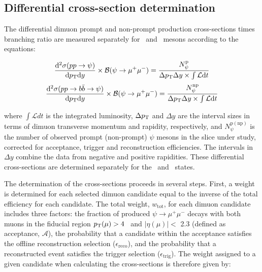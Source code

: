 \subsection{Differential cross-section determination}
\label{sec:s:diff_xSecDet}

The differential dimuon prompt and non-prompt production cross-sections times branching ratio 
are measured separately for \jpsi\ and \psiprime\ mesons according to the equations:

\begin{equation}
\frac{\mathrm{d}^2\sigma(pp \rightarrow \psi)}{\mathrm{d}\mbox{$p_{\text{T}}$}\mathrm{d}y} \times \mathcal{B} (\psi \rightarrow \mu^+\mu^- ) = \frac{N_{\psi}^{\mathrm{p}}}{\Delta \mbox{$p_{\text{T}}$} \Delta y \times \int\mathcal{L} \mathrm{d}t}
\label{equ:xSecP}
\end{equation}
\begin{equation}
\frac{\mathrm{d}^2\sigma(pp \rightarrow b\bar{b} \rightarrow \psi)}{\mathrm{d}\mbox{$p_{\text{T}}$}\mathrm{d}y} \times \mathcal{B} (\psi \rightarrow \mu^+\mu^- ) = \frac{N_{\psi}^{\mathrm{np}}}{\Delta \mbox{$p_{\text{T}}$} \Delta y \times \int\mathcal{L} \mathrm{d}t}
\label{equ:xSecNP}
\end{equation}

\noindent where $\int\mathcal{L} dt$ is the integrated luminosity, $\Delta \mbox{$p_{\text{T}}$} $ and $ \Delta y$ are the interval sizes in terms of dimuon transverse momentum and
rapidity, respectively, and $N_{\psi}^{\mathrm{p(np)}}$ is the number of observed prompt (non-prompt) $\psi$ mesons in
the slice under study, corrected for acceptance, trigger and reconstruction efficiencies. 
The intervals in $\Delta y$ combine the data from negative and positive rapidities.
These differential cross-sections are determined separately for the \jpsi\ and \psiprime\ states.

The determination of the cross-sections proceeds in several steps. First, a weight is determined for each
selected dimuon candidate equal to the inverse of the total efficiency for each candidate. 
The total weight, $w_\mathrm{tot}$, for each dimuon candidate includes three factors: the fraction of produced $\psi \rightarrow \mu^+\mu^-$ decays with both
muons in the fiducial region $\mbox{$p_{\text{T}}$} (\mu) > 4$ \GeV\ and $|\eta(\mu)| <$ 2.3 (defined as acceptance, $\mathcal{A}$), the probability that a candidate
within the acceptance satisfies the offline reconstruction selection ($\epsilon_\mathrm{reco}$), and 
the probability that a reconstructed event satisfies the trigger selection 
($\epsilon_\mathrm{trig}$). The weight assigned to a given candidate when calculating the cross-sections is therefore  given by:

